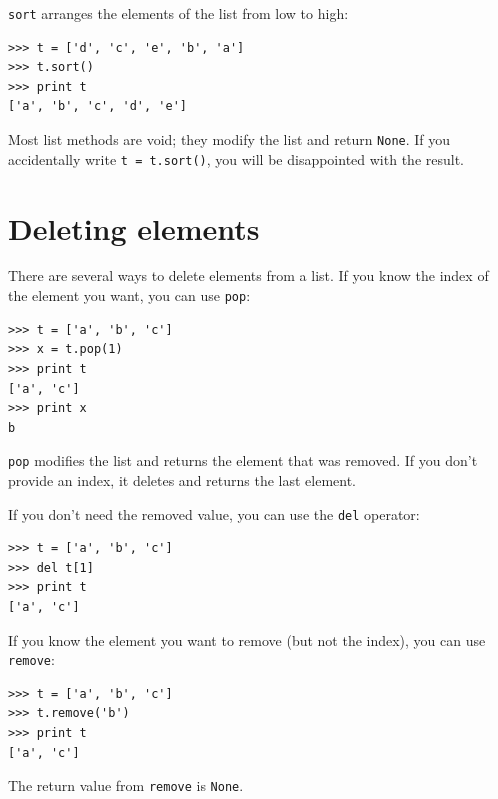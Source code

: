 \documentclass[10pt]{book}
\begin{document}
{\tt sort} arranges the elements of the list from low to high:


\beforeverb
\begin{verbatim}
>>> t = ['d', 'c', 'e', 'b', 'a']
>>> t.sort()
>>> print t
['a', 'b', 'c', 'd', 'e']
\end{verbatim}
\afterverb
%
Most list methods are void; they modify the list and return {\tt None}.
If you accidentally write {\tt t = t.sort()}, you will be disappointed
with the result.


\section{Deleting elements}


There are several ways to delete elements from a list.  If you
know the index of the element you want, you can use
{\tt pop}:


\beforeverb
\begin{verbatim}
>>> t = ['a', 'b', 'c']
>>> x = t.pop(1)
>>> print t
['a', 'c']
>>> print x
b
\end{verbatim}
\afterverb
%
{\tt pop} modifies the list and returns the element that was removed.
If you don't provide an index, it deletes and returns the
last element.

If you don't need the removed value, you can use the {\tt del}
operator:


\beforeverb
\begin{verbatim}
>>> t = ['a', 'b', 'c']
>>> del t[1]
>>> print t
['a', 'c']
\end{verbatim}
\afterverb
%

If you know the element you want to remove (but not the index), you
can use {\tt remove}:


\beforeverb
\begin{verbatim}
>>> t = ['a', 'b', 'c']
>>> t.remove('b')
>>> print t
['a', 'c']
\end{verbatim}
\afterverb
%
The return value from {\tt remove} is {\tt None}.
\end{document}
